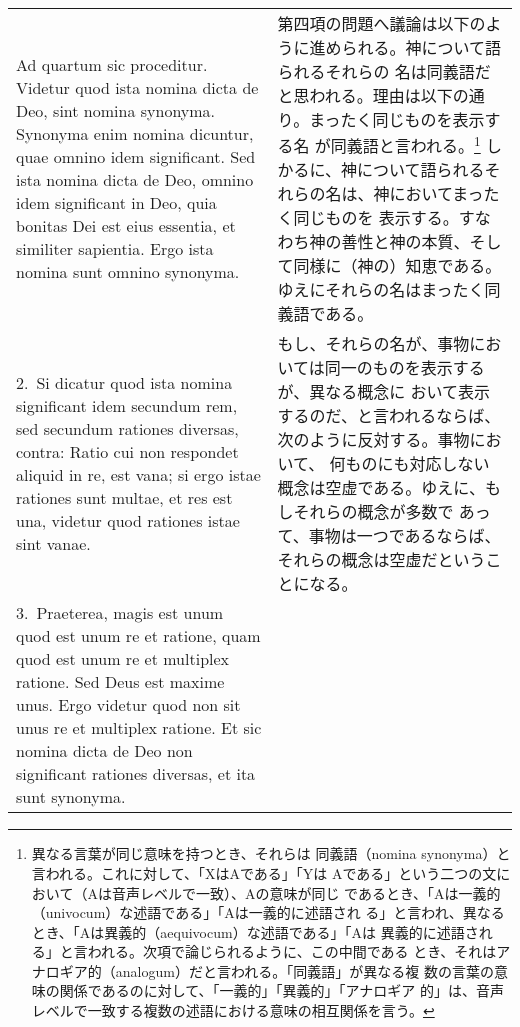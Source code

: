 \documentclass[10pt]{jsarticle} %
\begin{document}
\begin{longtable}{p{21em}p{21em}}

{\sc Ad quartum sic proceditur}. Videtur quod
 ista nomina dicta de Deo, sint nomina synonyma. Synonyma enim nomina
 dicuntur, quae omnino idem significant. Sed ista nomina dicta de Deo,
 omnino idem significant in Deo, quia bonitas Dei est eius essentia, et
 similiter sapientia. Ergo ista nomina sunt omnino synonyma.

&

第四項の問題へ議論は以下のように進められる。神について語られるそれらの
名は同義語だと思われる。理由は以下の通り。まったく同じものを表示する名
が同義語と言われる。\footnote{異なる言葉が同じ意味を持つとき、それらは
同義語（nomina synonyma）と言われる。これに対して、「XはAである」「Yは
Aである」という二つの文において（Aは音声レベルで一致）、Aの意味が同じ
であるとき、「Aは一義的（univocum）な述語である」「Aは一義的に述語され
る」と言われ、異なるとき、「Aは異義的（aequivocum）な述語である」「Aは
異義的に述語される」と言われる。次項で論じられるように、この中間である
とき、それはアナロギア的（analogum）だと言われる。「同義語」が異なる複
数の言葉の意味の関係であるのに対して、「一義的」「異義的」「アナロギア
的」は、音声レベルで一致する複数の述語における意味の相互関係を言う。}
しかるに、神について語られるそれらの名は、神においてまったく同じものを
表示する。すなわち神の善性と神の本質、そして同様に（神の）知恵である。
ゆえにそれらの名はまったく同義語である。

\\




2.~Si dicatur quod ista nomina significant
 idem secundum rem, sed secundum rationes diversas, contra: Ratio cui
 non respondet aliquid in re, est vana; si ergo istae rationes sunt
 multae, et res est una, videtur quod rationes istae sint vanae.

&

もし、それらの名が、事物においては同一のものを表示するが、異なる概念に
おいて表示するのだ、と言われるならば、次のように反対する。事物において、
何ものにも対応しない概念は空虚である。ゆえに、もしそれらの概念が多数で
あって、事物は一つであるならば、それらの概念は空虚だということになる。

\\

3.~{\sc Praeterea}, magis est unum quod est unum re
 et ratione, quam quod est unum re et multiplex ratione. Sed Deus est
 maxime unus. Ergo videtur quod non sit unus re et multiplex ratione. Et
 sic nomina dicta de Deo non significant rationes diversas, et ita sunt
 synonyma.


\end{longtable}
\end{document}
